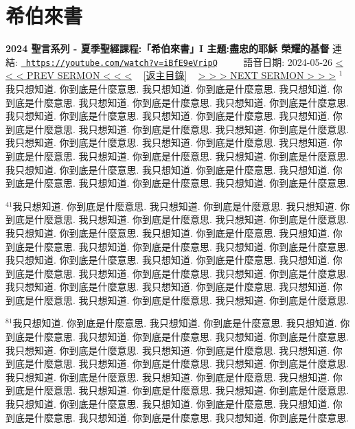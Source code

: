 \documentclass{book}
\begin{document}
\section{希伯來書}
\label{sec:iBfE9eVripQ}
\textbf{2024 聖言系列 - 夏季聖經課程:「希伯來書」I 主題:盡忠的耶穌 榮耀的基督}
\newline
\newline
連結: \href{https://youtube.com/watch?v=iBfE9eVripQ}{\texttt{ https://youtube.com/watch?v=iBfE9eVripQ}} ~~~~ 語音日期: 2024-05-26 
\newline
\newline
\hyperref[sec:R54GUORH3eY]{\small{< < < PREV SERMON < < <}}
~
\hyperref[sec:index]{\small{[返主目錄]}}
~
\hyperref[sec:7R3qM5b7DMI]{\small{> > > NEXT SERMON > > >}}
\newline
\newline
$^{1}$我只想知道.
你到底是什麼意思.
我只想知道.
你到底是什麼意思.
我只想知道.
你到底是什麼意思.
我只想知道.
你到底是什麼意思.
我只想知道.
你到底是什麼意思.
我只想知道.
你到底是什麼意思.
我只想知道.
你到底是什麼意思.
我只想知道.
你到底是什麼意思.
我只想知道.
你到底是什麼意思.
我只想知道.
你到底是什麼意思.
我只想知道.
你到底是什麼意思.
我只想知道.
你到底是什麼意思.
我只想知道.
你到底是什麼意思.
我只想知道.
你到底是什麼意思.
我只想知道.
你到底是什麼意思.
我只想知道.
你到底是什麼意思.
我只想知道.
你到底是什麼意思.
我只想知道.
你到底是什麼意思.
我只想知道.
你到底是什麼意思.
我只想知道.
你到底是什麼意思.

$^{41}$我只想知道.
你到底是什麼意思.
我只想知道.
你到底是什麼意思.
我只想知道.
你到底是什麼意思.
我只想知道.
你到底是什麼意思.
我只想知道.
你到底是什麼意思.
我只想知道.
你到底是什麼意思.
我只想知道.
你到底是什麼意思.
我只想知道.
你到底是什麼意思.
我只想知道.
你到底是什麼意思.
我只想知道.
你到底是什麼意思.
我只想知道.
你到底是什麼意思.
我只想知道.
你到底是什麼意思.
我只想知道.
你到底是什麼意思.
我只想知道.
你到底是什麼意思.
我只想知道.
你到底是什麼意思.
我只想知道.
你到底是什麼意思.
我只想知道.
你到底是什麼意思.
我只想知道.
你到底是什麼意思.
我只想知道.
你到底是什麼意思.
我只想知道.
你到底是什麼意思.

$^{81}$我只想知道.
你到底是什麼意思.
我只想知道.
你到底是什麼意思.
我只想知道.
你到底是什麼意思.
我只想知道.
你到底是什麼意思.
我只想知道.
你到底是什麼意思.
我只想知道.
你到底是什麼意思.
我只想知道.
你到底是什麼意思.
我只想知道.
你到底是什麼意思.
我只想知道.
你到底是什麼意思.
我只想知道.
你到底是什麼意思.
我只想知道.
你到底是什麼意思.
我只想知道.
你到底是什麼意思.
我只想知道.
你到底是什麼意思.
我只想知道.
你到底是什麼意思.
我只想知道.
你到底是什麼意思.
我只想知道.
你到底是什麼意思.
我只想知道.
你到底是什麼意思.
我只想知道.
你到底是什麼意思.
我只想知道.
你到底是什麼意思.
我只想知道.
你到底是什麼意思.
\end{document}
